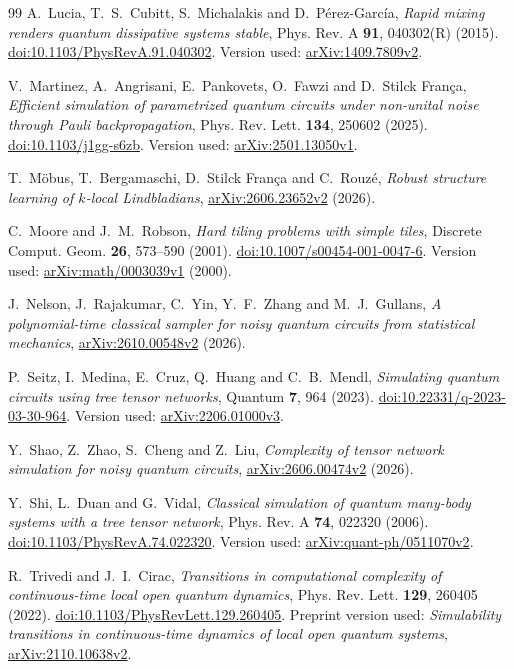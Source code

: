 \documentclass[11pt,reqno]{amsart}
\numberwithin{equation}{section}
\theoremstyle{definition}
\theoremstyle{remark}
\begin{document}
\begin{thebibliography}{99}
A.~Lucia, T.~S.~Cubitt, S.~Michalakis and D.~P\'erez-Garc\'ia,
\emph{Rapid mixing renders quantum dissipative systems stable},
Phys. Rev. A \textbf{91}, 040302(R) (2015).
\href{https://doi.org/10.1103/PhysRevA.91.040302}{doi:10.1103/PhysRevA.91.040302}.
Version used: \href{https://arxiv.org/abs/1409.7809v2}{arXiv:1409.7809v2}.

V.~Martinez, A.~Angrisani, E.~Pankovets, O.~Fawzi and D.~Stilck Fran\c ca,
\emph{Efficient simulation of parametrized quantum circuits under non-unital noise through Pauli backpropagation},
Phys. Rev. Lett. \textbf{134}, 250602 (2025).
\href{https://doi.org/10.1103/j1gg-s6zb}{doi:10.1103/j1gg-s6zb}.
Version used: \href{https://arxiv.org/abs/2501.13050v1}{arXiv:2501.13050v1}.

T.~M\"obus, T.~Bergamaschi, D.~Stilck Fran\c ca and C.~Rouz\'e,
\emph{Robust structure learning of $k$-local Lindbladians},
\href{https://arxiv.org/abs/2606.23652v2}{arXiv:2606.23652v2} (2026).

C.~Moore and J.~M.~Robson,
\emph{Hard tiling problems with simple tiles},
Discrete Comput. Geom. \textbf{26}, 573--590 (2001).
\href{https://doi.org/10.1007/s00454-001-0047-6}{doi:10.1007/s00454-001-0047-6}.
Version used: \href{https://arxiv.org/abs/math/0003039v1}{arXiv:math/0003039v1} (2000).

J.~Nelson, J.~Rajakumar, C.~Yin, Y.~F.~Zhang and M.~J.~Gullans,
\emph{A polynomial-time classical sampler for noisy quantum circuits from statistical mechanics},
\href{https://arxiv.org/abs/2610.00548v2}{arXiv:2610.00548v2} (2026).

P.~Seitz, I.~Medina, E.~Cruz, Q.~Huang and C.~B.~Mendl,
\emph{Simulating quantum circuits using tree tensor networks},
Quantum \textbf{7}, 964 (2023).
\href{https://doi.org/10.22331/q-2023-03-30-964}{doi:10.22331/q-2023-03-30-964}.
Version used: \href{https://arxiv.org/abs/2206.01000v3}{arXiv:2206.01000v3}.

Y.~Shao, Z.~Zhao, S.~Cheng and Z.~Liu,
\emph{Complexity of tensor network simulation for noisy quantum circuits},
\href{https://arxiv.org/abs/2606.00474v2}{arXiv:2606.00474v2} (2026).

Y.~Shi, L.~Duan and G.~Vidal,
\emph{Classical simulation of quantum many-body systems with a tree tensor network},
Phys. Rev. A \textbf{74}, 022320 (2006).
\href{https://doi.org/10.1103/PhysRevA.74.022320}{doi:10.1103/PhysRevA.74.022320}.
Version used: \href{https://arxiv.org/abs/quant-ph/0511070v2}{arXiv:quant-ph/0511070v2}.

R.~Trivedi and J.~I.~Cirac,
\emph{Transitions in computational complexity of continuous-time local open quantum dynamics},
Phys. Rev. Lett. \textbf{129}, 260405 (2022).
\href{https://doi.org/10.1103/PhysRevLett.129.260405}{doi:10.1103/PhysRevLett.129.260405}.
Preprint version used: \emph{Simulability transitions in continuous-time dynamics of local open quantum systems},
\href{https://arxiv.org/abs/2110.10638v2}{arXiv:2110.10638v2}.

\end{thebibliography}

\end{document}
